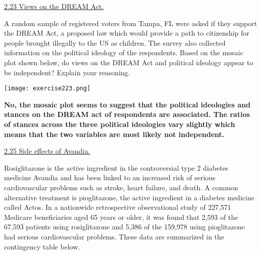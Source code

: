 \documentclass[10pt,letterpaper,unboxed,cm]{exam}
\begin{document}
\begin{questions}



	\question \underline{2.23 Views on the DREAM Act.}

    A random sample of registered voters from Tampa, FL were asked if they support the DREAM Act, a proposed law which would provide a path to citizenship for people brought illegally to the US as children. The survey also collected information on the political ideology of the respondents. Based on the mosaic plot shown below, do views on the DREAM Act and political ideology appear to be independent? Explain your reasoning.

    \texttt{[image: exercise223.png]}
    
    \bigskip
    {\bf No, the mosaic plot seems to suggest that the political ideologies and stances on the DREAM act of respondents are associated. The ratios of stances across the three political ideologies vary slightly which means that the two variables are most likely not independent.} 
    \bigskip



	\question \underline{2.25 Side effects of Avandia.}

    Rosiglitazone is the active ingredient in the controversial type 2 diabetes medicine Avandia and has been linked to an increased risk of serious cardiovascular problems such as stroke, heart failure, and death. A common alternative treatment is pioglitazone, the active ingredient in a diabetes medicine called Actos. In a nationwide retrospective observational study of 227,571 Medicare beneficiaries aged 65 years or older, it was found that 2,593 of the 67,593 patients using rosiglitazone and 5,386 of the 159,978 using pioglitazone had serious cardiovascular problems. These data are summarized in the contingency table below.


\end{questions}
\end{document}
